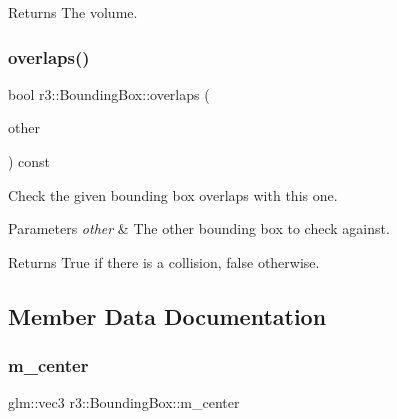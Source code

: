 \begin{DoxyReturn}{Returns}
The volume. 
\end{DoxyReturn}
\mbox{\label{classr3_1_1_bounding_box_a6e69163febe125531fa355ae9876b8be}} 
\subsubsection{\texorpdfstring{overlaps()}{overlaps()}}
{\footnotesize\ttfamily bool r3\+::\+Bounding\+Box\+::overlaps (\begin{DoxyParamCaption}\item[{const \mbox{\hyperlink{classr3_1_1_bounding_box}{Bounding\+Box}} $\ast$}]{other }\end{DoxyParamCaption}) const}



Check the given bounding box overlaps with this one. 


\begin{DoxyParams}{Parameters}
{\em other} & The other bounding box to check against. \\
\hline
\end{DoxyParams}
\begin{DoxyReturn}{Returns}
True if there is a collision, false otherwise. 
\end{DoxyReturn}


\subsection{Member Data Documentation}
\mbox{\label{classr3_1_1_bounding_box_ae7f47ade2f27fb7e76da58c944141d80}} 
\subsubsection{\texorpdfstring{m\+\_\+center}{m\_center}}
{\footnotesize\ttfamily glm\+::vec3 r3\+::\+Bounding\+Box\+::m\+\_\+center\hspace{0.3cm}{\ttfamily [protected]}}

\mbox{\label{classr3_1_1_bounding_box_ac95d88875ec61c04133186507bc613dc}} 
